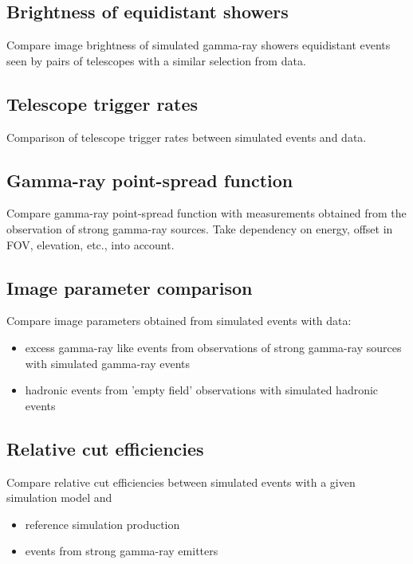 \subsection{Brightness of equidistant showers}

Compare image brightness of simulated gamma-ray showers equidistant events seen by pairs of telescopes with a similar selection from data.

\subsection{Telescope trigger rates}

Comparison of telescope trigger rates between simulated events and data.

\subsection{Gamma-ray point-spread function}

Compare gamma-ray point-spread function with measurements obtained from the observation of strong gamma-ray sources.
Take dependency on energy, offset in FOV, elevation, etc., into account.

\subsection{Image parameter comparison}

Compare image parameters obtained from simulated events with data:
\begin{itemize}
    \item excess gamma-ray like events from observations of strong gamma-ray sources with simulated gamma-ray events
    \item hadronic events from 'empty field' observations with simulated hadronic events
\end{itemize}

\subsection{Relative cut efficiencies}

Compare relative cut efficiencies between simulated events with a given simulation model and 
\begin{itemize}
    \item reference simulation production
    \item events from strong gamma-ray emitters
\end{itemize}

